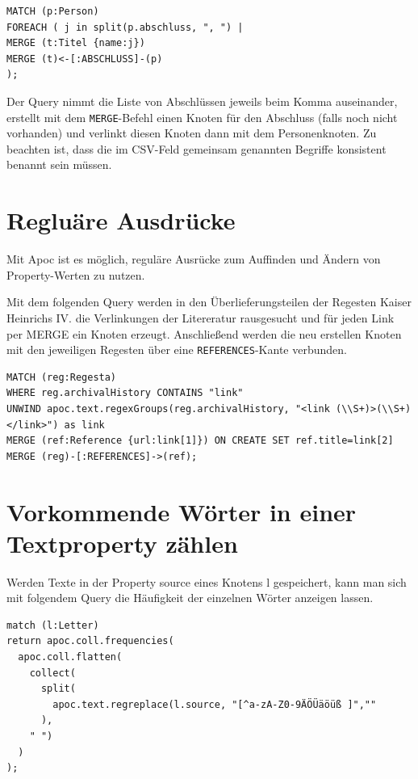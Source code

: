 \documentclass[ngerman,]{scrreprt}
\begin{document}
\begin{verbatim}
MATCH (p:Person)
FOREACH ( j in split(p.abschluss, ", ") |
MERGE (t:Titel {name:j})
MERGE (t)<-[:ABSCHLUSS]-(p)
);
\end{verbatim}

Der Query nimmt die Liste von Abschlüssen jeweils beim Komma auseinander, erstellt mit dem \texttt{MERGE}-Befehl einen Knoten für den Abschluss (falls noch nicht vorhanden) und verlinkt diesen Knoten dann mit dem Personenknoten. Zu beachten ist, dass die im CSV-Feld gemeinsam genannten Begriffe konsistent benannt sein müssen.

\section{Regluäre Ausdrücke}\label{regluuxe4re-ausdruxfccke}

Mit Apoc ist es möglich, reguläre Ausrücke zum Auffinden und Ändern von Property-Werten zu nutzen.

Mit dem folgenden Query werden in den Überlieferungsteilen der Regesten Kaiser Heinrichs IV. die Verlinkungen der Litereratur rausgesucht und für jeden Link per MERGE ein Knoten erzeugt. Anschließend werden die neu erstellen Knoten mit den jeweiligen Regesten über eine \texttt{REFERENCES}-Kante verbunden.

\begin{verbatim}
MATCH (reg:Regesta)
WHERE reg.archivalHistory CONTAINS "link"
UNWIND apoc.text.regexGroups(reg.archivalHistory, "<link (\\S+)>(\\S+)</link>") as link
MERGE (ref:Reference {url:link[1]}) ON CREATE SET ref.title=link[2]
MERGE (reg)-[:REFERENCES]->(ref);
\end{verbatim}

\section{Vorkommende Wörter in einer Textproperty zählen}\label{vorkommende-wuxf6rter-in-einer-textproperty-zuxe4hlen}

Werden Texte in der Property source eines Knotens l gespeichert, kann man sich mit folgendem Query die Häufigkeit der einzelnen Wörter anzeigen lassen.

\begin{verbatim}
match (l:Letter)
return apoc.coll.frequencies(
  apoc.coll.flatten(
    collect(
      split(
        apoc.text.regreplace(l.source, "[^a-zA-Z0-9ÄÖÜäöüß ]",""
      ),
    " ")
  )
);
\end{verbatim}
\end{document}
